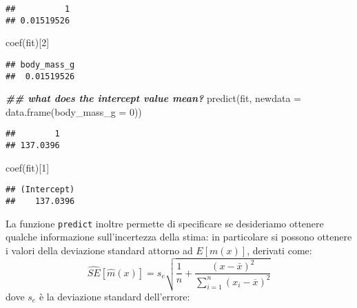 \documentclass[
]{article}
\newenvironment{Shaded}{\begin{snugshade}}{\end{snugshade}}
\newcommand{\AttributeTok}[1]{\textcolor[rgb]{0.77,0.63,0.00}{#1}}
\newcommand{\DecValTok}[1]{\textcolor[rgb]{0.00,0.00,0.81}{#1}}
\newcommand{\DocumentationTok}[1]{\textcolor[rgb]{0.56,0.35,0.01}{\textbf{\textit{#1}}}}
\newcommand{\FunctionTok}[1]{\textcolor[rgb]{0.00,0.00,0.00}{#1}}
\newcommand{\NormalTok}[1]{#1}
\newcommand{\OtherTok}[1]{\textcolor[rgb]{0.56,0.35,0.01}{#1}}
\newcommand{\SpecialCharTok}[1]{\textcolor[rgb]{0.00,0.00,0.00}{#1}}
\begin{document}
\begin{verbatim}
##          1 
## 0.01519526
\end{verbatim}

\begin{Shaded}
\begin{Highlighting}[]
\FunctionTok{coef}\NormalTok{(fit)[}\DecValTok{2}\NormalTok{]}
\end{Highlighting}
\end{Shaded}

\begin{verbatim}
## body_mass_g 
##  0.01519526
\end{verbatim}

\begin{Shaded}
\begin{Highlighting}[]
\DocumentationTok{\#\# what does the intercept value mean? }
\FunctionTok{predict}\NormalTok{(fit, }\AttributeTok{newdata =} \FunctionTok{data.frame}\NormalTok{(}\AttributeTok{body\_mass\_g =} \DecValTok{0}\NormalTok{))}
\end{Highlighting}
\end{Shaded}

\begin{verbatim}
##        1 
## 137.0396
\end{verbatim}

\begin{Shaded}
\begin{Highlighting}[]
\FunctionTok{coef}\NormalTok{(fit)[}\DecValTok{1}\NormalTok{]}
\end{Highlighting}
\end{Shaded}

\begin{verbatim}
## (Intercept) 
##    137.0396
\end{verbatim}

La funzione \texttt{predict} inoltre permette di specificare se
desideriamo ottenere qualche informazione sull'incertezza della stima:
in particolare si possono ottenere i valori della deviazione standard
attorno ad \(E[m(x)]\), derivati come:
\[\hat{SE}[\hat{m}(x)] = s_e\sqrt{\frac{1}{n}+\frac{(x-\bar{x})^2}{\sum_{i = 1}^n(x_i-\overline{x})^2}}\]
dove \(s_e\) è la deviazione standard dell'errore:

\begin{Shaded}
\end{Shaded}
\end{document}
